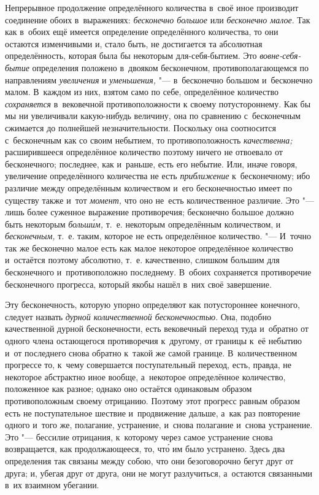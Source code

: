 Непрерывное продолжение определённого количества в~своё иное производит
соединение обоих в~выражениях: {\em бесконечно большое} или {\em бесконечно
малое}. Так как в~обоих ещё имеется определение определённого количества, то
они остаются изменчивыми и, стало быть, не достигается та абсолютная
определённость, которая была бы некоторым для-себя-бытием. Это
{\em вовне-себя-бытие} определения положено в~двояком бесконечном,
противополагающемся по направлениям {\em увеличения} и {\em уменьшения,} "---
в~бесконечно большом и~бесконечно малом. В~каждом из них, взятом само по себе,
определённое количество {\em сохраняется} в~вековечной противоположности к
своему потустороннему. Как бы мы ни увеличивали какую-нибудь величину, она по
сравнению с~бесконечным сжимается до полнейшей незначительности. Поскольку она
соотносится с~бесконечным как со своим небытием, то противоположность
{\em качественна;} расширившееся определённое количество поэтому ничего не
отвоевало от бесконечного; последнее, как и~раньше, есть его небытие. Или,
иначе говоря, увеличение определённого количества не есть {\em приближение}
к~бесконечному; ибо различие между определённым количеством и~его
бесконечностью имеет по существу также и~тот {\em момент,} что оно не~есть
количественное различие. Это "--- лишь более суженное выражение противоречия;
бесконечно большое должно быть некоторым {\em больш\'{и}м,} т.~е. некоторым
определённым количеством, и {\em бесконечным,} т.~е. таким, которое не есть
определённое количество. "--- И~точно так же бесконечно малое есть как малое
некоторое определённое количество и~остаётся поэтому абсолютно, т.~е.
качественно, слишком большим для бесконечного и~противоположно последнему.
В~обоих сохраняется противоречие бесконечного прогресса, который якобы нашёл
в~них своё завершение.

Эту бесконечность, которую упорно определяют как потустороннее конечного,
следует назвать {\em дурной количественной бесконечностью}. Она, подобно
качественной дурной бесконечности, есть вековечный переход туда и~обратно от
одного члена остающегося противоречия к~другому, от границы к~её небытию и~от
последнего снова обратно к~такой же самой границе. В~количественном прогрессе
то, к~чему совершается поступательный переход, есть, правда, не некоторое
абстрактно иное вообще, а~некоторое определённое количество, положенное как
разное; однако оно остаётся одинаковым образом противоположным своему
отрицанию. Поэтому этот прогресс равным образом есть не поступательное шествие
и~продвижение дальше, а~как раз повторение одного и~того же, полагание,
устранение, и~снова полагание и~снова устранение. Это "--- бессилие отрицания,
к~которому через самое устранение снова возвращается, как продолжающееся, то,
чт\'{о} им было устранено. Здесь два определения так связаны между собою, что они
безоговорочно бегут друг от друга; и, убегая друг от друга, они не могут
разлучиться, а~остаются связанными в~их взаимном убегании.

